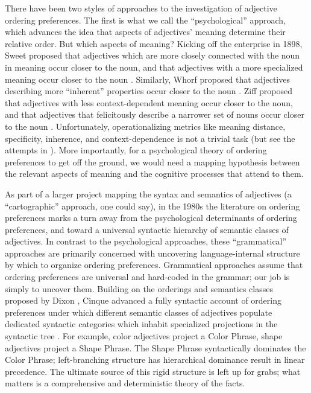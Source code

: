 \documentclass{pnastwo}
\begin{document}
\begin{article}
There have been two styles of approaches to the investigation of adjective ordering preferences. The first is what we call the ``psychological'' approach, which advances the idea that aspects of  adjectives' meaning determine their relative order. But which aspects of meaning? Kicking off the enterprise in 1898, Sweet proposed that adjectives which are more closely connected with the noun in meaning occur closer to the noun, and that adjectives with a more specialized meaning occur closer to the noun \cite{sweet1898}. Similarly, Whorf proposed that adjectives describing more ``inherent'' properties occur closer to the noun \cite{whorf1947}. Ziff proposed that adjectives with less context-dependent meaning occur closer to the noun, and that adjectives that felicitously describe a narrower set of nouns occur closer to the noun \cite{ziff1960}. Unfortunately, operationalizing metrics like meaning distance, specificity, inherence, and context-dependence is not a trivial task (but see the attempts in \cite{martin1969determinants}). More importantly, for a psychological theory of ordering preferences to get off the ground, we would need a mapping hypothesis between the relevant aspects of meaning and the cognitive processes that attend to them.

As part of a larger project mapping the syntax and semantics of adjectives (a ``cartographic'' approach, one could say), in the 1980s the literature on ordering preferences marks a turn away from the psychological determinants of ordering preferences, and toward a universal syntactic hierarchy of semantic classes of adjectives. In contrast to the psychological approaches, these ``grammatical'' approaches are primarily concerned with uncovering language-internal structure by which to organize ordering preferences. Grammatical approaches assume that ordering preferences are universal and hard-coded in the grammar; our job is simply to uncover them. 
Building on the orderings and semantics classes proposed by Dixon \cite{dixon1982}, Cinque advanced a fully syntactic account of ordering preferences under which different semantic classes of adjectives populate dedicated syntactic categories which inhabit specialized projections in the syntactic tree \cite{cinque1994}. For example, color adjectives project a Color Phrase, shape adjectives project a Shape Phrase. The Shape Phrase syntactically dominates the Color Phrase; left-branching structure has hierarchical dominance result in linear precedence. The ultimate source of this rigid structure is left up for grabs; what matters is a comprehensive and deterministic theory of the facts.





\end{article}
\end{document}
